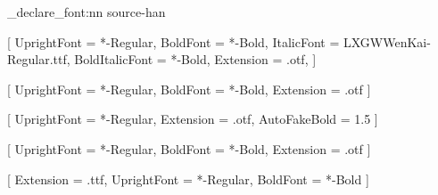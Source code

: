 \elegant_declare_font:nn { source-han }
  {
    \RequirePackage{xeCJK}

    [
      UprightFont = *-Regular,
      BoldFont = *-Bold,
      ItalicFont = LXGWWenKai-Regular.ttf,
      BoldItalicFont = *-Bold,
      Extension = .otf,
    ]

    [
      UprightFont = *-Regular,
      BoldFont = *-Bold,
      Extension = .otf
    ]

    [
      UprightFont = *-Regular,
      Extension = .otf,
      AutoFakeBold = 1.5
    ]
    
    [
      UprightFont = *-Regular,
      BoldFont = *-Bold,
      Extension = .otf
    ]

    [
      Extension = .ttf,
      UprightFont = *-Regular,
      BoldFont = *-Bold
    ]

    \DeclareDocumentCommand {}
    \DeclareDocumentCommand {}
    \DeclareDocumentCommand {}

  }
\endinput